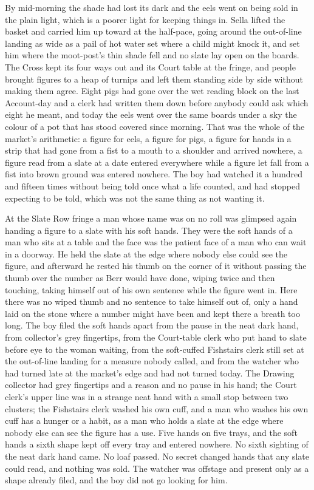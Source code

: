 By mid-morning the shade had lost its dark and the eels went on being sold in the plain light, which is a poorer light for keeping things in. Sella lifted the basket and carried him up toward  at the half-pace, going around the out-of-line landing as wide as a pail of hot water set where a child might knock it, and set him where the moot-post's thin shade fell and no slate lay open on the boards. The Cross kept its four ways out and its Court table at the  fringe, and people brought figures to a heap of turnips and left them standing side by side without making them agree. Eight pigs had gone over the wet reading block on the last Account-day and a clerk had written them down before anybody could ask which eight he meant, and today the eels went over the same boards under a sky the colour of a pot that has stood covered since morning. That was the whole of the market's arithmetic: a figure for eels, a figure for pigs, a figure for hands in a strip that had gone from a fist to a mouth to a shoulder and arrived nowhere, a figure read from a slate at a date entered everywhere while a figure let fall from a fist into brown ground was entered nowhere. The boy had watched it a hundred and fifteen times without being told once what a life counted, and had stopped expecting to be told, which was not the same thing as not wanting it.

At the Slate Row fringe a man whose name was on no roll was glimpsed again handing a figure to a slate with his soft hands. They were the soft hands of a man who sits at a table and the face was the patient face of a man who can wait in a doorway. He held the slate at the edge where nobody else could see the figure, and afterward he rested his thumb on the corner of it without passing the thumb over the number as Berr would have done, wiping twice and then touching, taking himself out of his own sentence while the figure went in. Here there was no wiped thumb and no sentence to take himself out of, only a hand laid on the stone where a number might have been and kept there a breath too long. The boy filed the soft hands apart from the pause in the neat dark hand, from  collector's grey fingertips, from the Court-table clerk who put hand to slate before eye to the woman waiting, from the soft-cuffed Fishstairs clerk still set at the out-of-line landing for a measure nobody called, and from the watcher who had turned late at the market's edge and had not turned today. The Drawing collector had grey fingertips and a reason and no pause in his hand; the Court clerk's upper line was in a strange neat hand with a small stop between two clusters; the Fishstairs clerk washed his own cuff, and a man who washes his own cuff has a hunger or a habit, as a man who holds a slate at the edge where nobody else can see the figure has a use. Five hands on five trays, and the soft hands a sixth shape kept off every tray and entered nowhere. No sixth sighting of the neat dark hand came. No loaf passed. No secret changed hands that any slate could read, and nothing was sold. The watcher was offstage and present only as a shape already filed, and the boy did not go looking for him.

